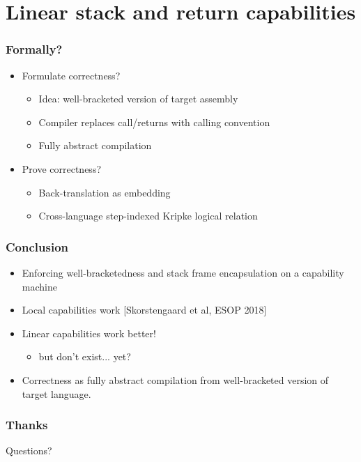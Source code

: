 \documentclass{beamer}
\begin{document}
\section{Linear stack and return capabilities}


\begin{frame}
  \frametitle{Formally?}

  \begin{itemize}
  \item<2-> Formulate correctness?
    \begin{itemize}
    \item<4-> Idea: well-bracketed version of target assembly
    \item<4-> Compiler replaces call/returns with calling convention
    \item<3-> Fully abstract compilation
    \end{itemize}
  \item Prove correctness?
    \begin{itemize}
    \item<5-> Back-translation as embedding
    \item<5-> Cross-language step-indexed Kripke logical relation
    \end{itemize}
  \end{itemize}
\end{frame}

\begin{frame}
  \frametitle{Conclusion}
  \begin{itemize}
  \item Enforcing well-bracketedness and stack frame encapsulation on a capability machine
  \item Local capabilities work [Skorstengaard et al, ESOP 2018]
  \item Linear capabilities work better!
    \begin{itemize}
    \item but don't exist... yet?
    \end{itemize}
  \item Correctness as fully abstract compilation from well-bracketed version of target language.
  \end{itemize}
\end{frame}

\begin{frame}
  \frametitle{Thanks}
  \begin{center}
    \Large Questions?
  \end{center}
\end{frame}
\end{document}

